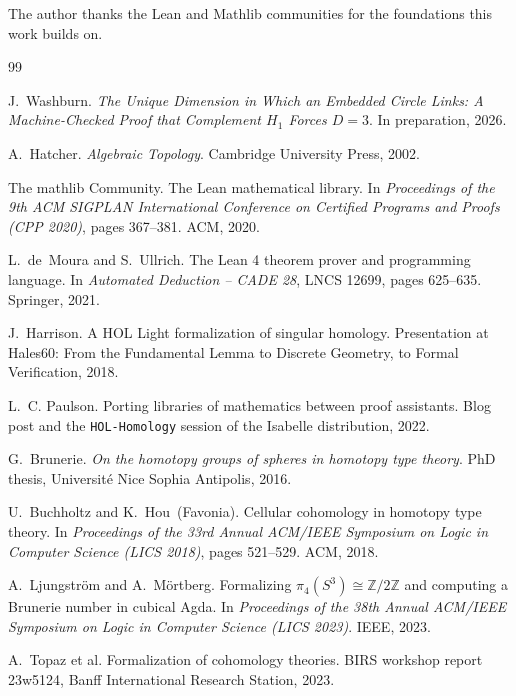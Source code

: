 \documentclass[11pt]{article}
\theoremstyle{remark}
\begin{document}
The author thanks the Lean and Mathlib communities for the foundations this
work builds on.

\begin{thebibliography}{99}

J.~Washburn.
\newblock \emph{The Unique Dimension in Which an Embedded Circle Links: A
  Machine-Checked Proof that Complement $H_1$ Forces $D = 3$}.
\newblock In preparation, 2026.

A.~Hatcher.
\newblock \emph{Algebraic Topology}.
\newblock Cambridge University Press, 2002.

The mathlib Community.
\newblock The Lean mathematical library.
\newblock In \emph{Proceedings of the 9th ACM SIGPLAN International
  Conference on Certified Programs and Proofs (CPP 2020)}, pages 367--381.
  ACM, 2020.

L.~de~Moura and S.~Ullrich.
\newblock The Lean 4 theorem prover and programming language.
\newblock In \emph{Automated Deduction -- CADE 28}, LNCS 12699, pages
  625--635. Springer, 2021.

J.~Harrison.
\newblock A HOL Light formalization of singular homology.
\newblock Presentation at Hales60: From the Fundamental Lemma to Discrete
  Geometry, to Formal Verification, 2018.

L.~C. Paulson.
\newblock Porting libraries of mathematics between proof assistants.
\newblock Blog post and the \texttt{HOL-Homology} session of the Isabelle
  distribution, 2022.

G.~Brunerie.
\newblock \emph{On the homotopy groups of spheres in homotopy type theory}.
\newblock PhD thesis, Universit\'e Nice Sophia Antipolis, 2016.

U.~Buchholtz and K.~Hou~(Favonia).
\newblock Cellular cohomology in homotopy type theory.
\newblock In \emph{Proceedings of the 33rd Annual ACM/IEEE Symposium on
  Logic in Computer Science (LICS 2018)}, pages 521--529. ACM, 2018.

A.~Ljungstr\"om and A.~M\"ortberg.
\newblock Formalizing $\pi_4(S^3) \cong \mathbb{Z}/2\mathbb{Z}$ and
  computing a Brunerie number in cubical Agda.
\newblock In \emph{Proceedings of the 38th Annual ACM/IEEE Symposium on
  Logic in Computer Science (LICS 2023)}. IEEE, 2023.

A.~Topaz et al.
\newblock Formalization of cohomology theories.
\newblock BIRS workshop report 23w5124, Banff International Research
  Station, 2023.

\end{thebibliography}
\end{document}
